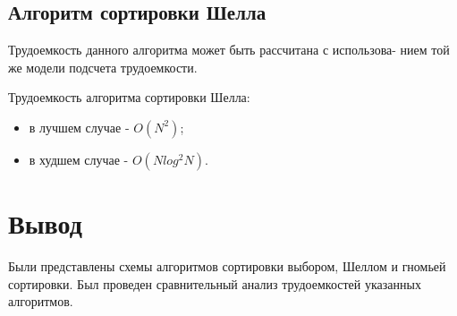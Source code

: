 \subsection{Алгоритм сортировки Шелла}

Трудоемкость данного алгоритма может быть рассчитана с использова-
нием той же модели подсчета трудоемкости.

Трудоемкость алгоритма сортировки Шелла:

\begin{itemize}
	\item в лучшем случае - $O(N^2)$;
	\item в худшем случае - $O(Nlog^2N)$.
\end{itemize}

\section*{Вывод}

Были представлены схемы алгоритмов сортировки выбором, Шеллом и гномьей сортировки. Был проведен сравнительный анализ трудоемкостей указанных алгоритмов.
